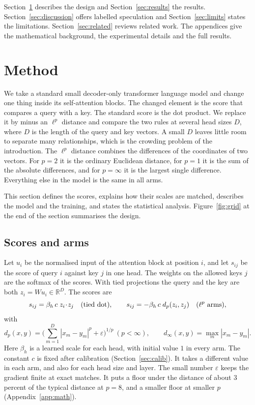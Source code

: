 \documentclass[11pt]{article}
\newcommand{\Lp}{\ensuremath{\ell^p}}
\begin{document}
Section~\ref{sec:method} describes the design and Section~\ref{sec:results} the results.
Section~\ref{sec:discussion} offers labelled speculation and Section~\ref{sec:limits} states the limitations.
Section~\ref{sec:related} reviews related work.
The appendices give the mathematical background, the experimental details and the full results.

\section{Method}\label{sec:method}

We take a standard small decoder-only transformer language model and change one thing inside its self-attention blocks.
The changed element is the score that compares a query with a key.
The standard score is the dot product.
We replace it by minus an $\ell^p$ distance and compare the two rules at several head sizes $D$, where $D$ is the length of the query and key vectors.
A small $D$ leaves little room to separate many relationships, which is the crowding problem of the introduction.
The $\ell^p$ distance combines the differences of the coordinates of two vectors.
For $p=2$ it is the ordinary Euclidean distance, for $p=1$ it is the sum of the absolute differences, and for $p=\infty$ it is the largest single difference.
Everything else in the model is the same in all arms.

This section defines the scores, explains how their scales are matched, describes the model and the training, and states the statistical analysis.
Figure~\ref{fig:grid} at the end of the section summarises the design.

\subsection{Scores and arms}

Let $u_i$ be the normalised input of the attention block at position $i$, and let $s_{ij}$ be the score of query $i$ against key $j$ in one head.
The weights on the allowed keys $j$ are the softmax of the scores.
With tied projections the query and the key are both $z_i=Wu_i\in\mathbb{R}^D$.
The scores are
\begin{equation}
s_{ij}=\beta_h\,c\;z_i\!\cdot\! z_j\quad\text{(tied dot)},\qquad
s_{ij}=-\beta_h\,c\;d_p(z_i,z_j)\quad(\text{\Lp{} arms}),
\end{equation}
with
\begin{equation}
d_p(x,y)=\Big(\sum_{m=1}^{D}|x_m-y_m|^p+\varepsilon\Big)^{1/p}\ (p<\infty),\qquad d_\infty(x,y)=\max_m|x_m-y_m|.
\end{equation}
Here $\beta_h$ is a learned scale for each head, with initial value $1$ in every arm.
The constant $c$ is fixed after calibration (Section~\ref{sec:calib}).
It takes a different value in each arm, and also for each head size and layer.
The small number $\varepsilon$ keeps the gradient finite at exact matches.
It puts a floor under the distance of about 3 percent of the typical distance at $p=8$, and a smaller floor at smaller $p$ (Appendix~\ref{app:math}).
\end{document}
